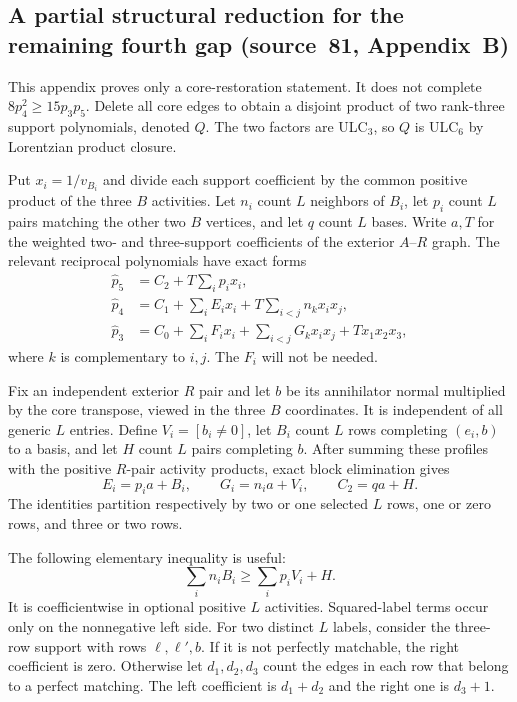 \documentclass[11pt,a4paper]{article}
\theoremstyle{remark}\newtheorem{remark}[theorem]{Remark}
\begin{document}
\subsection{A partial structural reduction for the remaining fourth gap (source~81, Appendix~B)}\label{mrn:t:tn:sec:fourth}
This appendix proves only a core-restoration statement. It does not
complete $8p_4^2\ge15p_3p_5$.
Delete all core edges to obtain a disjoint product of two rank-three
support polynomials, denoted $Q$. The two factors are ULC$_3$, so $Q$
is ULC$_6$ by Lorentzian product closure.

Put $x_i=1/v_{B_i}$ and divide each support coefficient by the common
positive product of the three $B$ activities. Let $n_i$ count $L$ neighbors
of $B_i$, let $p_i$ count $L$ pairs matching the other two $B$ vertices,
and let $q$ count $L$ bases. Write $a,T$ for the weighted two- and
three-support coefficients of the exterior $A$--$R$ graph. The relevant
reciprocal polynomials have exact forms
\begin{align*}
 \widehat p_5&=C_2+T\sum_i p_ix_i,\\
 \widehat p_4&=C_1+\sum_iE_ix_i+
                         T\sum_{i<j}n_kx_ix_j,\\
 \widehat p_3&=C_0+\sum_iF_ix_i+
                         \sum_{i<j}G_kx_ix_j+Tx_1x_2x_3,
\end{align*}
where $k$ is complementary to $i,j$. The $F_i$ will not be needed.

Fix an independent exterior $R$ pair and let $b$ be its annihilator
normal multiplied by the core transpose, viewed in the three $B$
coordinates. It is independent of all generic $L$ entries.
Define $V_i=[b_i\ne0]$, let $B_i$ count $L$ rows completing $(e_i,b)$
to a basis, and let $H$ count $L$ pairs completing $b$.
After summing these profiles with the positive $R$-pair activity products,
exact block elimination gives
\[
 E_i=p_i a+B_i,\qquad G_i=n_i a+V_i,\qquad C_2=qa+H.
\]
The identities partition respectively by two or one selected $L$ rows,
one or zero rows, and three or two rows.

The following elementary inequality is useful:
\begin{equation}\label{mrn:t:tn:app:allowed}
 \sum_i n_iB_i\ge\sum_i p_iV_i+H.
\end{equation}
It is coefficientwise in optional positive $L$ activities. Squared-label
terms occur only on the nonnegative left side. For two distinct $L$ labels,
consider the three-row support with rows $\ell,\ell',b$.
If it is not perfectly matchable, the right coefficient is zero.
Otherwise let $d_1,d_2,d_3$ count the edges in each row that belong to a
perfect matching. The left coefficient is $d_1+d_2$ and the right one
is $d_3+1$.
\end{document}
